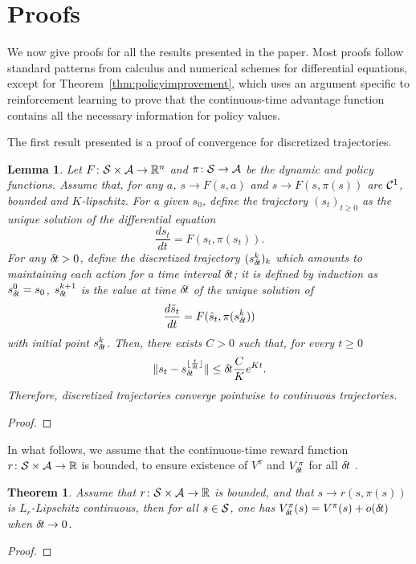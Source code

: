 \documentclass[11pt]{article}
\newtheorem{theorem}{Theorem}
\newtheorem{lemma}{Lemma}
\begin{document}
\section{Proofs}

We now give proofs for all the results presented in the paper. Most
proofs follow standard patterns from calculus and numerical schemes for
differential equations, except for Theorem~\ref{thm:policyimprovement},
which uses an argument specific to reinforcement learning to prove that
the continuous-time advantage function contains all the necessary
information for policy values.


The first result presented is a proof of convergence for discretized
trajectories.
\begin{lemma}
	Let $F\colon {\cal S} \times {\cal A} \rightarrow \mathbb{R}^n$ and $\pi\colon {\cal S}
	\rightarrow {\cal A}$ be the dynamic and policy functions. Assume that,
	for any $a$, $s \rightarrow F(s, a)$ and $s \rightarrow F(s, \pi(s))$
	are ${\cal C}^1$, bounded and $K$-lipschitz.  For
	a given $s_0$, define the trajectory $(s_t)_{t\geq 0}$ as the unique
	solution of the differential equation
	\begin{equation}
		\frac{ds_t}{dt} = F(s_t, \pi(s_t)).
		\label{eq:diff}
	\end{equation}
	For any ${\delta\hspace{-.1em}t} > 0$, define the discretized trajectory
	$(s_{\delta\hspace{-.1em}t}^k)_k$ which amounts to maintaining each action for a
	time interval ${\delta\hspace{-.1em}t}$; it is defined by induction as $s_{\delta\hspace{-.1em}t}^0 = s_0$,
	$s_{\delta\hspace{-.1em}t}^{k + 1}$ is the value at time ${\delta\hspace{-.1em}t}$ of
	the unique solution of
	\begin{equation}
		\frac{d\tilde{s}_t}{dt} = F(\tilde{s}_t, \pi(s_{\delta\hspace{-.1em}t}^k))
		\label{eq:diff_2}
	\end{equation}
	with initial point $s_{\delta\hspace{-.1em}t}^k$.
	Then, there exists $C > 0$ such that, for every $t \geq 0$
	\begin{equation}
		\|s_t - s_{\delta\hspace{-.1em}t}^{\lfloor \frac{t}{{\delta\hspace{-.1em}t}} \rfloor}\|
		\leq {\delta\hspace{-.1em}t} \frac{C}{K}e^{Kt}.
	\end{equation}
	Therefore, discretized trajectories converge pointwise to continuous trajectories.
	\label{th:traj-conv}
\end{lemma}
\begin{proof}
	
\end{proof}

In what follows, we assume that the continuous-time reward function $r\colon {\cal S} \times {\cal A} \rightarrow \mathbb{R}$
is bounded, to ensure existence of $V^\pi$ and $V^\pi_{\delta\hspace{-.1em}t}$ for all ${\delta\hspace{-.1em}t}$
.\begin{theorem}
	Assume that $r\colon {\cal S} \times {\cal A} \rightarrow \mathbb{R}$ is bounded, and
	that $s \rightarrow r(s, \pi(s))$ is $L_r$-Lipschitz continuous, then
	for all $s \in {\cal S}$, one has
	$V^\pi_{\delta\hspace{-.1em}t}(s) = V^\pi(s) + o({\delta\hspace{-.1em}t})$
	when ${\delta\hspace{-.1em}t}\to 0$.
	\label{th:conv-value}
\end{theorem}
\begin{proof}
	
\end{proof}
\end{document}
